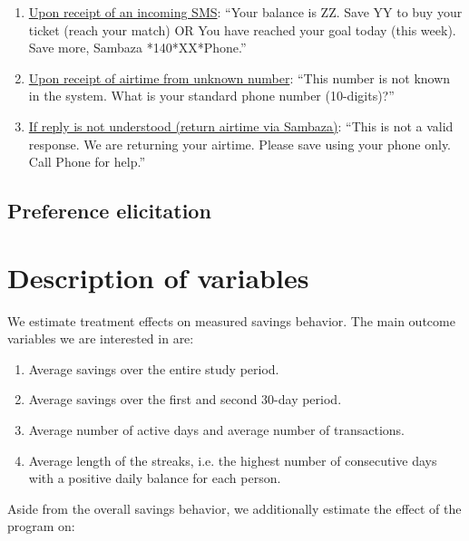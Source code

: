 \documentclass[11pt]{article}
\begin{document}
            \begin{enumerate}
                \item \underline{Upon receipt of an incoming SMS}: ``Your balance is ZZ.  Save YY to buy your ticket (reach your match) OR You have reached your goal today (this week).  Save more, Sambaza *140*XX*Phone.''
                \item \underline{Upon receipt of airtime from unknown number}: ``This number is not known in the system.  What is your standard phone number (10-digits)?''
                \item \underline{If reply is not understood (return airtime via Sambaza)}: ``This is not a valid response.  We are returning your airtime.  Please save using your phone only.  Call Phone for help.''
            \end{enumerate}

    \subsection{Preference elicitation}

	\clearpage

\section{Description of variables}

	We estimate treatment effects on measured savings behavior. The main outcome variables we are interested in are:

		\begin{enumerate}
		\item Average savings over the entire study period.
		\item Average savings over the first and second 30-day period.
		\item Average number of active days and average number of transactions.
		\item Average length of the streaks, i.e. the highest number of consecutive days with a positive daily balance for each person.
		\end{enumerate}

	Aside from the overall savings behavior, we additionally estimate the effect of the program on:
\end{document}
